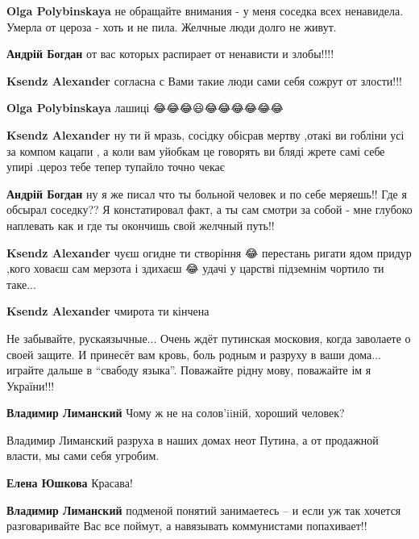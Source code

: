 \begin{itemize}
\begin{itemize}

\textbf{Olga Polybinskaya} не обращайте внимания - у меня соседка всех
ненавидела. Умерла от цероза - хоть и не пила. Желчные люди долго не живут.

\textbf{Андрій Богдан} от вас которых распирает от ненависти и злобы!!!!

\textbf{Ksendz Alexander} согласна с Вами такие люди сами себя сожрут от злости!!!

\textbf{Olga Polybinskaya} лашиці \Laughey[1.0]\Laughey[1.0]\Laughey[1.0]😂😂😂😃😂😂😂😂😂😂

\textbf{Ksendz Alexander} ну ти й мразь, сосідку обісрав мертву ,отакі ви гобліни усі за компом кацапи , а коли вам уйобкам це говорять ви бляді жрете самі себе упирі .цероз тебе тепер тупайло точно чекає \Laughey[1.0]\Laughey[1.0]\Laughey[1.0]

\textbf{Андрій Богдан} ну я же писал что ты больной человек и по себе меряешь!! Где я обсырал соседку?? Я констатировал факт, а ты сам смотри за собой - мне глубоко наплевать как и где ты окончишь свой желчный путь!!

\textbf{Ksendz Alexander} чуєш огидне ти створіння 😂 перестань ригати ядом придур ,кого ховаєш сам мерзота і здихаєш 😂 удачі у царстві підземнім чортило ти таке...

\textbf{Ksendz Alexander} чмирота ти кінчена \Laughey[1.0]\Laughey[1.0]\Laughey[1.0]
\end{itemize}


Не забывайте, рускаязычные... Очень ждёт путинская московия, когда заволаете о
своей защите. И принесёт вам кровь, боль родным и разруху в ваши дома...
играйте дальше в \enquote{свабоду языка}. Поважайте рідну мову, поважайте ім я
України!!!

\begin{itemize}
\textbf{Владимир Лиманский} Чому ж не на солов'iiнiй, хороший человек?

Владимир Лиманский разруха в наших домах неот Путина, а от продажной власти, мы сами себя угробим.

\textbf{Елена Юшкова} Красава!

\textbf{Владимир Лиманский} подменой понятий занимаетесь -- и если уж так хочется разговаривайте Вас все поймут, а навязывать коммунистами попахивает!!


\end{itemize}
\end{itemize}
